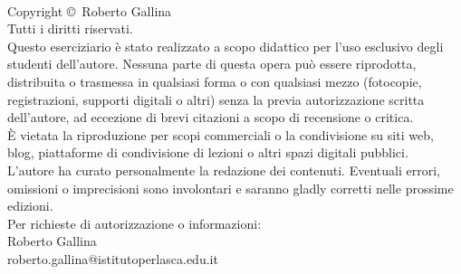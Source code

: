 \newpage
~\vfill
\thispagestyle{empty}

\noindent Copyright \copyright\ Roberto Gallina \\

\noindent Tutti i diritti riservati. \\

\noindent Questo eserciziario è stato realizzato a scopo didattico per l'uso esclusivo degli studenti dell'autore. Nessuna parte di questa opera può essere riprodotta, distribuita o trasmessa in qualsiasi forma o con qualsiasi mezzo (fotocopie, registrazioni, supporti digitali o altri) senza la previa autorizzazione scritta dell'autore, ad eccezione di brevi citazioni a scopo di recensione o critica. \\

\noindent È vietata la riproduzione per scopi commerciali o la condivisione su siti web, blog, piattaforme di condivisione di lezioni o altri spazi digitali pubblici. \\

\noindent L'autore ha curato personalmente la redazione dei contenuti. Eventuali errori, omissioni o imprecisioni sono involontari e saranno gladly corretti nelle prossime edizioni. \\

\noindent Per richieste di autorizzazione o informazioni: \\
Roberto Gallina \\
roberto.gallina@istitutoperlasca.edu.it \\
